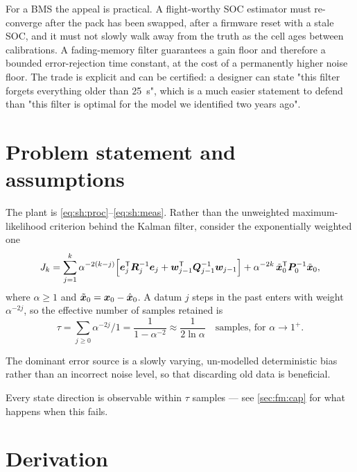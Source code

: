 For a BMS the appeal is practical.  A flight-worthy SOC estimator must re-converge after the pack has
been swapped, after a firmware reset with a stale SOC, and it must not slowly walk away from the
truth as the cell ages between calibrations.  A fading-memory filter guarantees a gain floor and
therefore a bounded error-rejection time constant, at the cost of a permanently higher noise floor.
The trade is explicit and can be certified: a designer can state "this filter forgets everything
older than \SI{25}{\second}", which is a much easier statement to defend than "this filter is
optimal for the model we identified two years ago".

\section{Problem statement and assumptions}
The plant is \eqref{eq:sh:proc}--\eqref{eq:sh:meas}.  Rather than the unweighted maximum-likelihood
criterion behind the Kalman filter, consider the exponentially weighted one
\begin{equation}
J_k = \sum_{j=1}^{k}\alpha^{-2(k-j)}\Big[\bm{e}_j^{\mathsf{T}}\bm{R}_j^{-1}\bm{e}_j + \bm{w}_{j-1}^{\mathsf{T}}\bm{Q}_{j-1}^{-1}\bm{w}_{j-1}\Big]
      + \alpha^{-2k}\,\tilde{\bm{x}}_0^{\mathsf{T}}\bm{P}_0^{-1}\tilde{\bm{x}}_0 ,
\label{eq:fm:cost}
\end{equation}
where $\alpha\ge1$ and $\tilde{\bm{x}}_0=\bm{x}_0-\hat{\bm{x}}_0$.  A datum $j$ steps in the past enters with
weight $\alpha^{-2j}$, so the effective number of samples retained is
\begin{equation}
\tau = \sum_{j\ge0}\alpha^{-2j}\Big/1 = \frac{1}{1-\alpha^{-2}} \approx \frac{1}{2\ln\alpha}
\quad\text{samples, for } \alpha\to1^+ .
\label{eq:fm:tau}
\end{equation}

\begin{assumption}\label{as:fm:mismatch}
The dominant error source is a slowly varying, un-modelled deterministic bias rather than an
incorrect noise level, so that discarding old data is beneficial.
\end{assumption}
\begin{assumption}\label{as:fm:obs}
Every state direction is observable within $\tau$ samples --- see \cref{sec:fm:cap} for what happens
when this fails.
\end{assumption}

\section{Derivation}


